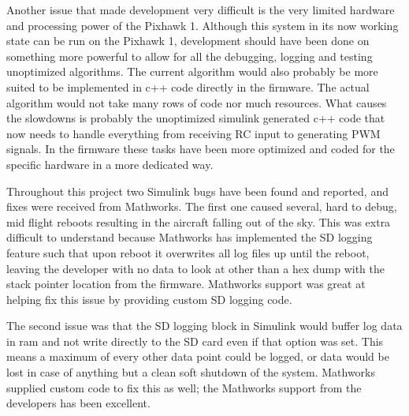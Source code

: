 \documentclass{article}
\begin{document}
Another issue that made development very difficult is the very limited hardware and processing power of the Pixhawk 1.
Although this system in its now working state can be run on the Pixhawk 1, development should have been done on something more powerful to allow for all the debugging, logging and testing unoptimized algorithms.
The current algorithm would also probably be more suited to be implemented in c++ code directly in the firmware.
The actual algorithm would not take many rows of code nor much resources.
What causes the slowdowns is probably the unoptimized simulink generated c++ code that now needs to handle everything from receiving RC input to generating PWM signals.
In the firmware these tasks have been more optimized and coded for the specific hardware in a more dedicated way.

Throughout this project two Simulink bugs have been found and reported, and fixes were received from Mathworks.
The first one caused several, hard to debug, mid flight reboots resulting in the aircraft falling out of the sky.
This was extra difficult to understand because Mathworks has implemented the SD logging feature such that upon reboot it overwrites all log files up until the reboot, leaving the developer with no data to look at other than a hex dump with the stack pointer location from the firmware.
Mathworks support was great at helping fix this issue by providing custom SD logging code.

The second issue was that the SD logging block in Simulink would buffer log data in ram and not write directly to the SD card even if that option was set.
This means a maximum of every other data point could be logged, or data would be lost in case of anything but a clean soft shutdown of the system.
Mathworks supplied custom code to fix this as well; the Mathworks support from the developers has been excellent.
\end{document}
